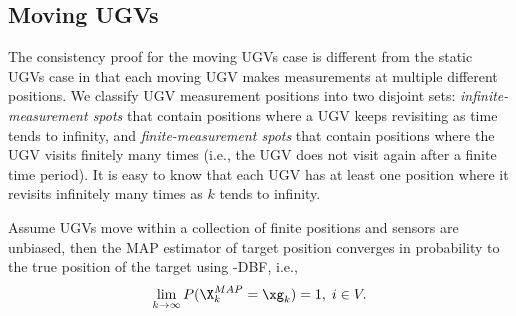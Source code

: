 	\subsection{Moving UGVs}
	The consistency proof for the moving UGVs case is different from the static UGVs case in that each moving UGV makes measurements at multiple different positions.
	We classify UGV measurement positions into two disjoint sets: \textit{infinite-measurement spots} that contain positions where a UGV keeps revisiting as time tends to infinity, and \textit{finite-measurement spots} that contain positions where the UGV visits finitely many times (i.e., the UGV does not visit again after a finite time period).
	It is easy to know that each UGV has at least one position where it revisits infinitely many times as $k$ tends to infinity.
%		
			
	\begin{thm}\label{thm:\proto-dbf-mov-ugv}
		Assume UGVs move within a collection of finite positions and sensors are unbiased, then the MAP estimator of target position converges in probability to the true position of the target using \proto-DBF, i.e.,
		\small\begin{equation*}
		\lim\limits_{k\rightarrow \infty}
		P(\X^{MAP}_k=\xg_k)=1,\;i\in V.
		\end{equation*}\normalsize
	\end{thm}
		
